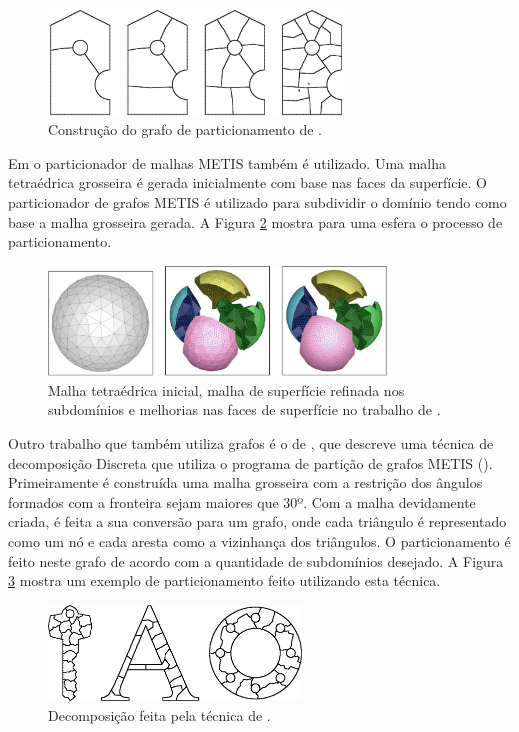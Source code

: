  \begin{figure}[htbp]
     \centering
     \includegraphics[width=0.7\textwidth]{fig/leonidas06.jpg}
     \caption{Construção do grafo de particionamento de \cite{bib:Leonidas06}.}
     \label{fig:leonidas06}
 \end{figure} 
 

Em \cite{bib:Ito07} o particionador de malhas METIS também é utilizado. Uma malha tetraédrica grosseira é gerada inicialmente com base nas faces da superfície. O particionador de grafos METIS é utilizado para subdividir o domínio tendo como base a malha grosseira gerada. A Figura \ref{fig:ito} mostra para uma esfera o processo de particionamento.


\begin{figure}[htbp]
  \centering
  \includegraphics[width=0.8\textwidth]{fig/ito.png}
   \caption{Malha tetraédrica inicial, malha de superfície refinada nos subdomínios e melhorias nas faces de superfície no trabalho de \cite{bib:Ito07}.}
  \label{fig:ito}
\end{figure}

Outro trabalho que também utiliza grafos é o de \cite{bib:PANITANARAK11}, que descreve uma técnica de decomposição Discreta que utiliza o programa de partição de grafos METIS (\cite{bib:Karypis98}). Primeiramente é construída uma malha grosseira com a restrição dos ângulos formados com a fronteira sejam maiores que 30º. Com a malha devidamente criada, é feita a sua conversão para um grafo, onde cada triângulo é representado como um nó e cada aresta como a vizinhança dos triângulos. O particionamento é feito neste grafo de acordo com a quantidade de subdomínios desejado. A Figura \ref{fig:panitanarak} mostra um exemplo de particionamento feito utilizando esta técnica.


\begin{figure}[htbp]
  \centering
  \includegraphics[width=0.6\textwidth]{fig/panitanarak.png}
   \caption{Decomposição feita pela técnica de \cite{bib:PANITANARAK11}.}
  \label{fig:panitanarak}
\end{figure}



